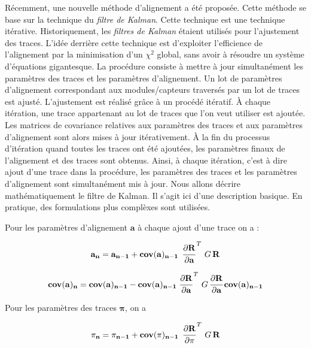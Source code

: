 \begin{appendices}
   R\'ecemment, une nouvelle m\'ethode d'alignement a \'et\'e propos\'ee. Cette m\'ethode se base sur la technique du \textit{filtre de Kalman}. Cette technique est une technique it\'erative. Historiquement, les \textit{filtres de Kalman} \'etaient utilis\'es pour l'ajustement des traces. L'id\'ee derri\`ere cette technique est d'exploiter l'efficience de l'alignement par la minimisation d'un $\chi^2$ global, sans avoir \`a r\'esoudre un syst\`eme d'\'equations gigantesque. La proc\'edure consiste \`a mettre \`a jour simultan\'ement les  param\`etres des traces et les param\`etres d'alignement. Un lot de param\`etres d'alignement correspondant aux modules/capteurs travers\'es par un lot de traces est ajust\'e. L'ajustement est r\'ealis\'e grâce \`a un proc\'ed\'e itératif. \`A chaque it\'eration, une trace appartenant au lot de traces que l'on veut utiliser est ajout\'ee. Les matrices de covariance relatives aux param\`etres des traces et aux param\`etres d'alignement sont alors mises \`a jour it\'erativement. \`A la fin du processus d'it\'eration quand toutes les traces ont \'et\'e ajout\'ees, les param\`etres finaux de l'alignement et des traces sont obtenus. Ainsi, \`a chaque it\'eration, c'est \`a dire ajout d'une trace dans la proc\'edure, les param\`etres des traces et les param\`etres d'alignement sont simultan\'ement mis \`a jour. Nous allons d\'ecrire math\'ematiquement le filtre de Kalman. Il s'agit ici d'une description basique. En pratique, des formulations plus compl\`exes sont utilis\'ees.
      
   \medskip
   
   Pour les param\`etres d'alignement $\mathbf{a}$ \`a chaque ajout d'une trace on a :
   
   \begin{equation}
    \mathbf{a_n} = \mathbf{a_{n-1}} + \mathbf{cov(a)_{n-1}} \, \left. \cfrac{ \partial \mathbf{R} }{ \partial \mathbf{a} } \right.^T \, G \, \mathbf{R}
   \end{equation}

   \begin{equation}
    \mathbf{cov(a)_{n}} = \mathbf{cov(a)_{n-1}} -  \mathbf{cov(a)_{n-1}} \left. \cfrac{ \partial \mathbf{R} }{ \partial \mathbf{a} } \right.^T \, G \, \cfrac{ \partial \mathbf{R} }{ \partial \mathbf{a} } \, \mathbf{cov(a)_{n-1}}
   \end{equation}

   Pour les param\`etres des traces $\mathbf{\pi}$, on a
   
   \begin{equation}
    \mathbf{\pi_n} = \mathbf{\pi_{n-1}} + \mathbf{cov(\pi)_{n-1}} \, \left. \cfrac{ \partial \mathbf{R} }{ \partial \mathbf{\pi} } \right.^T \, G \, \mathbf{R}
   \end{equation} 
   

\end{appendices}
